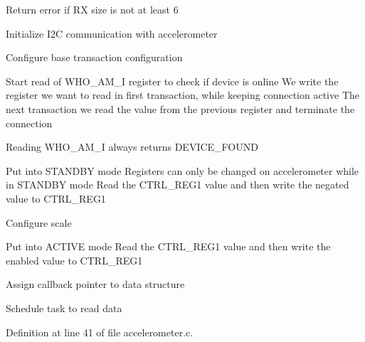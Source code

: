 Return error if RX size is not at least 6

Initialize I2C communication with accelerometer

Configure base transaction configuration

Start read of W\+H\+O\+\_\+\+A\+M\+\_\+I register to check if device is online We write the register we want to read in first transaction, while keeping connection active The next transaction we read the value from the previous register and terminate the connection

Reading W\+H\+O\+\_\+\+A\+M\+\_\+I always returns D\+E\+V\+I\+C\+E\+\_\+\+F\+O\+U\+ND

Put into S\+T\+A\+N\+D\+BY mode Registers can only be changed on accelerometer while in S\+T\+A\+N\+D\+BY mode Read the C\+T\+R\+L\+\_\+\+R\+E\+G1 value and then write the negated value to C\+T\+R\+L\+\_\+\+R\+E\+G1

Configure scale

Put into A\+C\+T\+I\+VE mode Read the C\+T\+R\+L\+\_\+\+R\+E\+G1 value and then write the enabled value to C\+T\+R\+L\+\_\+\+R\+E\+G1

Assign callback pointer to data structure

Schedule task to read data 

Definition at line 41 of file accelerometer.\+c.

